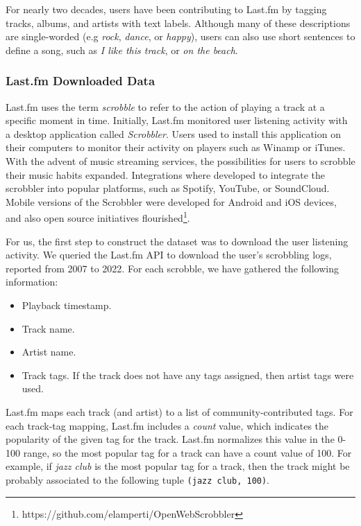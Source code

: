 \documentclass[sn-mathphys]{sn-jnl}%
\theoremstyle{thmstyleone}%
\theoremstyle{thmstyletwo}%
\theoremstyle{thmstylethree}%
\begin{document}
For nearly two decades, users have been contributing to Last.fm by tagging tracks, albums, and artists with text labels.
Although many of these descriptions are single-worded (e.g \emph{rock}, \emph{dance}, or \emph{happy}),
users can also use short sentences to define a song, such as \emph{I like this track}, or \emph{on the beach}.


\subsubsection{Last.fm Downloaded Data}

Last.fm uses the term \emph{scrobble} to refer to the action of playing a track at a specific moment in time.
Initially, Last.fm monitored user listening activity with a desktop application called \emph{Scrobbler}.
Users used to install this application on their computers to monitor their activity on players such as Winamp or iTunes.
With the advent of music streaming services, the possibilities for users to scrobble their music habits expanded.
Integrations where developed to integrate the scrobbler into popular platforms,
such as Spotify, YouTube, or SoundCloud.
Mobile versions of the Scrobbler were developed for Android and iOS devices, and also open source initiatives flourished\footnote[6]{https://github.com/elamperti/OpenWebScrobbler}.


For us, the first step to construct the dataset was to download the user listening activity.
We queried the Last.fm API to download the user{'}s scrobbling logs, reported from 2007 to 2022.
For each scrobble, we have gathered the following information:

\begin{itemize}
\item Playback timestamp.
\item Track name.
\item Artist name.
\item Track tags. If the track does not have any tags assigned,
then artist tags were used.
\end{itemize}

Last.fm maps each track (and artist) to a list of community-contributed tags.
For each track-tag mapping, Last.fm includes
a \emph{count} value, which indicates the popularity of the given tag for the track.
Last.fm normalizes this value in the 0-100 range, so the most popular tag for a track can have a
count value of 100.
For example, if \emph{jazz club} is the most popular tag for a track,
then the track might be probably
associated to the following tuple \verb|(jazz club, 100)|.
\end{document}
